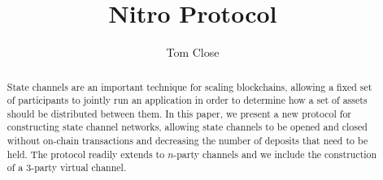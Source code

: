 \documentclass{article}
\title{Nitro Protocol}
\author{Tom Close}
\begin{document}
\maketitle
\begin{abstract}
  State channels are an important technique for scaling blockchains, allowing a fixed set of participants to jointly run an application in order to determine how a set of assets should be distributed between them.
  In this paper, we present a new protocol for constructing state channel networks, allowing state channels to be opened and closed without on-chain transactions and decreasing the number of deposits that need to be held.
  The protocol readily extends to $n$-party channels and we include the construction of a 3-party virtual channel.
\end{abstract}

















\end{document}
